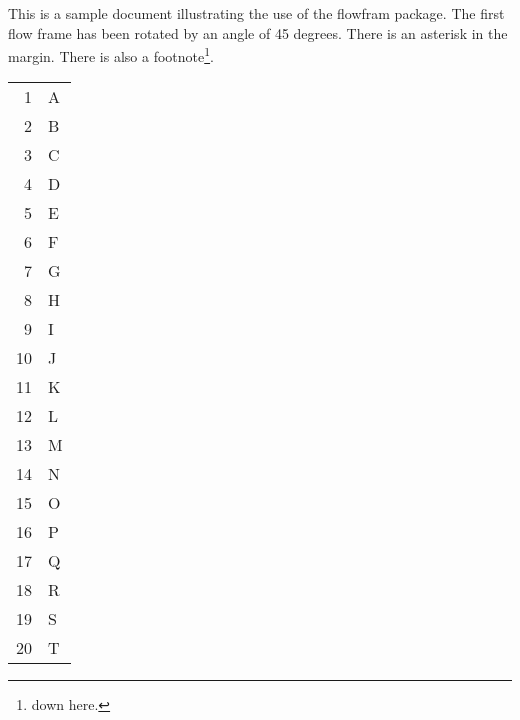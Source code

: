 \documentclass[a4paper]{article}
\begin{document}
This is a sample document illustrating the use of the
flowfram package. The first flow frame has been rotated
by an angle of 45 degrees. There is an asterisk in the
margin\marginpar{*}. There is also a
footnote\footnote{down here.}.

\framebreak
\begin{supertabular}{rl}
1 & A\\
2 & B\\
3 & C\\
4 & D\\
5 & E\\
6 & F\\
7 & G\\
8 & H\\
9 & I\\
10 & J\\
11 & K\\
12 & L\\
13 & M\\
14 & N\\
15 & O\\
16 & P\\
17 & Q\\
18 & R\\
19 & S\\
20 & T\\
\end{supertabular}
\end{document}
